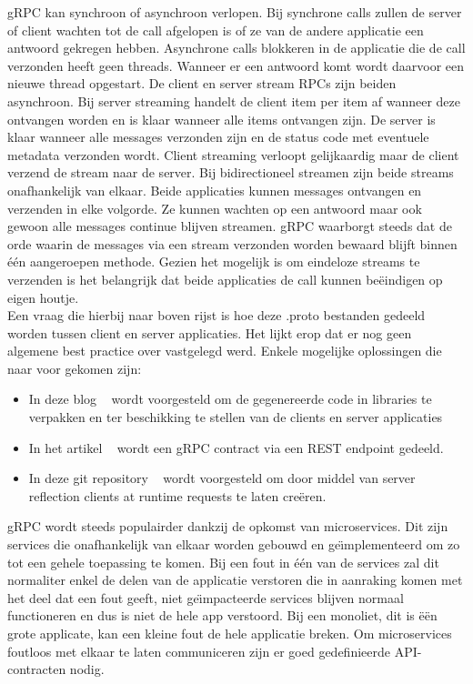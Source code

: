 gRPC kan synchroon of asynchroon verlopen. Bij synchrone calls zullen de server of client wachten tot de call afgelopen is of ze van de andere applicatie een antwoord gekregen hebben.
Asynchrone calls blokkeren in de applicatie die de call verzonden heeft geen threads. Wanneer er een antwoord komt wordt daarvoor een nieuwe thread opgestart.
De client en server stream RPCs zijn beiden asynchroon. Bij server streaming handelt de client item per item af wanneer deze ontvangen worden en is klaar wanneer alle items ontvangen zijn.
De server is klaar wanneer alle messages verzonden zijn en de status code met eventuele metadata verzonden wordt.
Client streaming verloopt gelijkaardig maar de client verzend de stream naar de server.
Bij bidirectioneel streamen zijn beide streams onafhankelijk van elkaar. Beide applicaties kunnen messages ontvangen en verzenden in elke volgorde.
Ze kunnen wachten op een antwoord maar ook gewoon alle messages continue blijven streamen.
gRPC waarborgt steeds dat de orde waarin de messages via een stream verzonden worden bewaard blijft binnen \'e\'en aangeroepen methode.
Gezien het mogelijk is om eindeloze streams te verzenden is het belangrijk dat beide applicaties de call kunnen be\"eindigen op eigen houtje.\newline
~\autocite{grpccoreconcepts}\\

Een vraag die hierbij naar boven rijst is hoe deze .proto bestanden gedeeld worden tussen client en server applicaties.
Het lijkt erop dat er nog geen algemene best practice over vastgelegd werd. Enkele mogelijke oplossingen
die naar voor gekomen zijn:
\begin{itemize}
    \item In deze blog ~\parencite{protofilesharingSol1} wordt voorgesteld om de gegenereerde code in libraries te verpakken en ter beschikking te stellen van de clients en server applicaties
    \item In het artikel ~\parencite{protofilesharingSol2} wordt een gRPC contract via een REST endpoint gedeeld.
    \item In deze git repository ~\parencite{protofilesharingSol3} wordt voorgesteld om door middel van server reflection clients at runtime requests te laten cre\"eren.
\end{itemize}

gRPC wordt steeds populairder dankzij de opkomst van microservices. Dit zijn services die onafhankelijk van elkaar worden gebouwd en ge\"{\i}mplementeerd om
zo tot een gehele toepassing te komen. Bij een fout in \'e\'en van de services zal dit normaliter enkel de delen van de applicatie verstoren die in aanraking komen
met het deel dat een fout geeft, niet ge\"{\i}mpacteerde services blijven normaal functioneren en dus is niet de hele app verstoord. Bij een monoliet, dit is \"e\"en grote applicate,
kan een kleine fout de hele applicatie breken. Om microservices foutloos met elkaar te laten communiceren zijn er goed gedefinieerde API-contracten nodig.\newline
~\autocite{microsoft}\\

